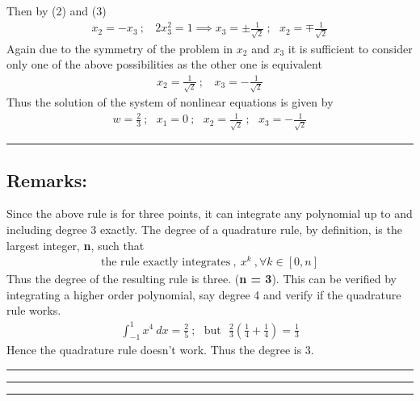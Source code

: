 Then by (2) and (3)
\begin{align*}
x_2 = -x_3\ ; \ \ \ \ 2x^2_3 = 1 \implies x_3 = \pm \frac{1}{\sqrt{2}}\ ; \ \ \ x_2 = \mp \frac{1}{\sqrt{2}}
\end{align*}
Again due to the symmetry of the problem in $x_2$ and $x_3$ it is sufficient to consider only one of the above possibilities as the other one is equivalent
\begin{align*}
x_2 = \frac{1}{\sqrt{2}}\ ; \ \ \ \ x_3 = -\frac{1}{\sqrt{2}}
\end{align*}
Thus the solution of the system of nonlinear equations is given by 
\begin{align}
\boxed{w = \frac{2}{3}\ ; \ \ \ x_1 = 0\ ; \ \ \ x_2 = \frac{1}{\sqrt{2}}\ ; \ \ \ x_3 = -\frac{1}{\sqrt{2}}}
\end{align}\hrule
\subsection*{Remarks: }
Since the above rule is for three points, it can integrate any polynomial up to and including degree 3 exactly. The degree of a quadrature rule, by definition, is the largest integer, {\bf n}, such that 
\begin{align*} 
\text{the rule exactly integrates}\ ,\ x^k\ ,\forall k \in [0,n] 
\end{align*}
Thus the degree of the resulting rule is three. ({\bf n = 3}). This can be verified by integrating a higher order polynomial, say degree 4 and verify if the quadrature rule works. 
\begin{align}
\int_{-1}^1 x^4\ dx = \frac{2}{5}\ ; \ \ \ \text{but}\ \ \ \frac{2}{3}\left( \frac{1}{4} + \frac{1}{4}\right) = \frac{1}{3} 
\end{align} 
Hence the quadrature rule doesn't work. Thus the degree is 3. \\ \hrule\hrule\hrule
